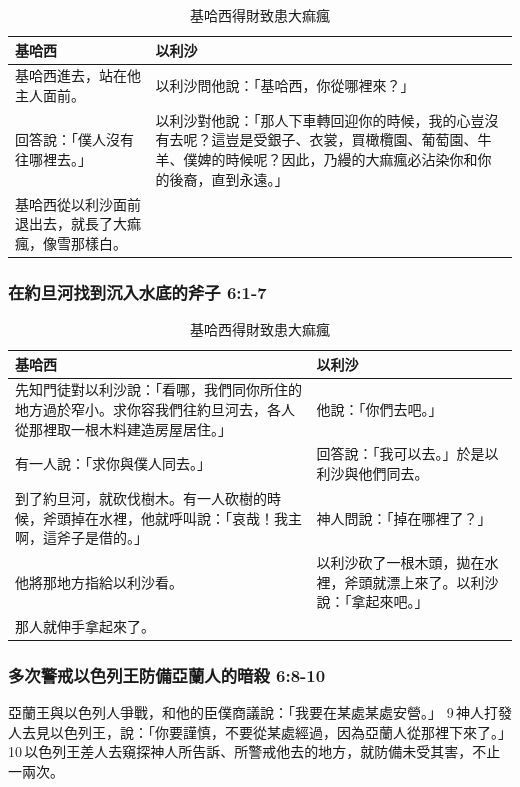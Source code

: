 \begin{table}[H]
\centering
\begin{tabular}{p{}|p{9.5cm}}\hline\hline
基哈西&以利沙\\\hline
基哈西進去，站在他主人面前。&以利沙問他說：「基哈西，你從哪裡來？」\\\hline
回答說：「僕人沒有往哪裡去。」 &以利沙對他說：「那人下車轉回迎你的時候，我的心豈沒有去呢？這豈是受銀子、衣裳，買橄欖園、葡萄園、牛羊、僕婢的時候呢？因此，乃縵的大痲瘋必沾染你和你的後裔，直到永遠。」\\\hline
基哈西從以利沙面前退出去，就長了大痲瘋，像雪那樣白。&\\\hline
\end{tabular}
\caption{基哈西得財致患大痲瘋}
\end{table}


\subsubsection{在約旦河找到沉入水底的斧子 6:1-7}
\begin{table}[H]
\centering
\begin{tabular}{p{}|p{}}\hline\hline
基哈西&以利沙\\\hline
先知門徒對以利沙說：「看哪，我們同你所住的地方過於窄小。求你容我們往約旦河去，各人從那裡取一根木料建造房屋居住。」&他說：「你們去吧。」\\\hline
有一人說：「求你與僕人同去。」 &回答說：「我可以去。」於是以利沙與他們同去。\\\hline
到了約旦河，就砍伐樹木。有一人砍樹的時候，斧頭掉在水裡，他就呼叫說：「哀哉！我主啊，這斧子是借的。」&神人問說：「掉在哪裡了？」\\\hline
他將那地方指給以利沙看。&以利沙砍了一根木頭，拋在水裡，斧頭就漂上來了。以利沙說：「拿起來吧。」\\\hline
那人就伸手拿起來了。&\\\hline
\end{tabular}
\caption{基哈西得財致患大痲瘋}
\end{table}


\subsubsection{多次警戒以色列王防備亞蘭人的暗殺 6:8-10}
亞蘭王與以色列人爭戰，和他的臣僕商議說：「我要在某處某處安營。」 9 神人打發人去見以色列王，說：「你要謹慎，不要從某處經過，因為亞蘭人從那裡下來了。」 10 以色列王差人去窺探神人所告訴、所警戒他去的地方，就防備未受其害，不止一兩次。

